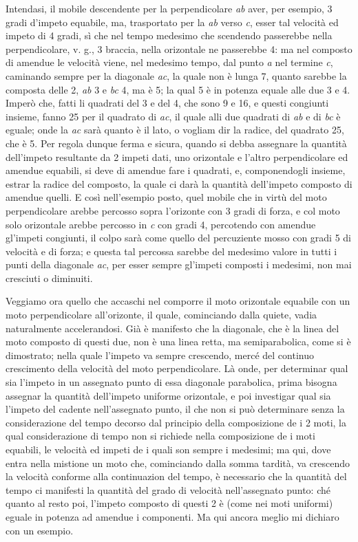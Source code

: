 \documentclass[11pt,twoside,openany]{book}
\begin{document}
Intendasi, il mobile descendente per la perpendicolare \emph{ab} aver, per esempio, 3 gradi d'impeto equabile, ma, trasportato per la \emph{ab} verso \emph{c}, esser tal velocità ed impeto di 4 gradi, sì che nel tempo medesimo che scendendo passerebbe nella perpendicolare, v. g., 3 braccia, nella orizontale ne passerebbe 4: ma nel composto di amendue le velocità viene, nel medesimo tempo, dal punto \emph{a} nel termine \emph{c}, caminando sempre per la diagonale \emph{ac}, la quale non è lunga 7, quanto sarebbe la composta delle 2, \emph{ab} 3 e \emph{bc} 4, ma è 5; la qual 5 è in potenza equale alle due 3 e 4. Imperò che, fatti li quadrati del 3 e del 4, che sono 9 e 16, e questi congiunti insieme, fanno 25 per il quadrato di \emph{ac}, il quale alli due quadrati di \emph{ab} e di \emph{bc} è eguale; onde la \emph{ac} sarà quanto è il lato, o vogliam dir la radice, del quadrato 25, che è 5. Per regola dunque ferma e sicura, quando si debba assegnare la quantità dell'impeto resultante da 2 impeti dati, uno orizontale e l'altro perpendicolare ed amendue equabili, si deve di amendue fare i quadrati, e, componendogli insieme, estrar la radice del composto, la quale ci darà la quantità dell'impeto composto di amendue quelli. E così nell'esempio posto, quel mobile che in virtù del moto perpendicolare arebbe percosso sopra l'orizonte con 3 gradi di forza, e col moto solo orizontale arebbe percosso in \emph{c} con gradi 4, percotendo con amendue gl'impeti congiunti, il colpo sarà come quello del percuziente mosso con gradi 5 di velocità e di forza; e questa tal percossa sarebbe del medesimo valore in tutti i punti della diagonale \emph{ac}, per esser sempre gl'impeti composti i medesimi, non mai cresciuti o diminuiti.

Veggiamo ora quello che accaschi nel comporre il moto orizontale equabile con un moto perpendicolare all'orizonte, il quale, cominciando dalla quiete, vadia naturalmente accelerandosi. Già è manifesto che la diagonale, che è la linea del moto composto di questi due, non è una linea retta, ma semiparabolica, come si è dimostrato; nella quale l'impeto va sempre crescendo, mercé del continuo crescimento della velocità del moto perpendicolare. Là onde, per determinar qual sia l'impeto in un assegnato punto di essa diagonale parabolica, prima bisogna assegnar la quantità dell'impeto uniforme orizontale, e poi investigar qual sia l'impeto del cadente nell'assegnato punto, il che non si può determinare senza la considerazione del tempo decorso dal principio della composizione de i 2 moti, la qual considerazione di tempo non si richiede nella composizione de i moti equabili, le velocità ed impeti de i quali son sempre i medesimi; ma qui, dove entra nella mistione un moto che, cominciando dalla somma tardità, va crescendo la velocità conforme alla continuazion del tempo, è necessario che la quantità del tempo ci manifesti la quantità del grado di velocità nell'assegnato punto: ché quanto al resto poi, l'impeto composto di questi 2 è (come nei moti uniformi) eguale in potenza ad amendue i componenti. Ma qui ancora meglio mi dichiaro con un esempio.
\end{document}

